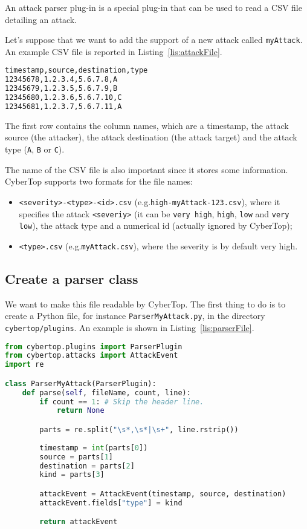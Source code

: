 \documentclass{scrartcl}
\newcommand{\eg}{e.g.\xspace}
\begin{document}
An attack parser plug-in is a special plug-in that can be used to read a CSV file detailing an attack.

Let's suppose that we want to add the support of a new attack called \lstinline|myAttack|. An example CSV file is reported in Listing~\ref{lis:attackFile}.

\begin{lstlisting}[language = XML, caption = Example of an attack file., label = lis:attackFile]
timestamp,source,destination,type
12345678,1.2.3.4,5.6.7.8,A
12345679,1.2.3.5,5.6.7.9,B
12345680,1.2.3.6,5.6.7.10,C
12345681,1.2.3.7,5.6.7.11,A
\end{lstlisting}

The first row contains the column names, which are a timestamp, the attack source (the attacker), the attack destination (the attack target) and the attack type (\lstinline|A|, \lstinline|B| or \lstinline|C|).

The name of the CSV file is also important since it stores some information. CyberTop supports two formats for the file names:

\begin{itemize}
	\item \lstinline|<severity>-<type>-<id>.csv| (\eg \lstinline|high-myAttack-123.csv|), where it specifies the attack \lstinline|<severiy>| (it can be \lstinline|very high|, \lstinline|high|, \lstinline|low| and \lstinline|very low|), the attack type and a numerical id (actually ignored by CyberTop);
	\item \lstinline|<type>.csv| (\eg \lstinline|myAttack.csv|), where the severity is by default very high.
\end{itemize}

\subsection{Create a parser class}

We want to make this file readable by CyberTop. The first thing to do is to create a Python file, for instance \lstinline|ParserMyAttack.py|, in the directory \lstinline|cybertop/plugins|. An example is shown in Listing~\ref{lis:parserFile}.

\begin{lstlisting}[language = Python, caption = Example of an attack parser plug-in., label = lis:parserFile]
from cybertop.plugins import ParserPlugin
from cybertop.attacks import AttackEvent
import re

class ParserMyAttack(ParserPlugin):
	def parse(self, fileName, count, line):
		if count == 1: # Skip the header line.
			return None

		parts = re.split("\s*,\s*|\s+", line.rstrip())
		
		timestamp = int(parts[0])
		source = parts[1]
		destination = parts[2]
		kind = parts[3]

		attackEvent = AttackEvent(timestamp, source, destination)
		attackEvent.fields["type"] = kind

		return attackEvent
\end{lstlisting}
\end{document}

